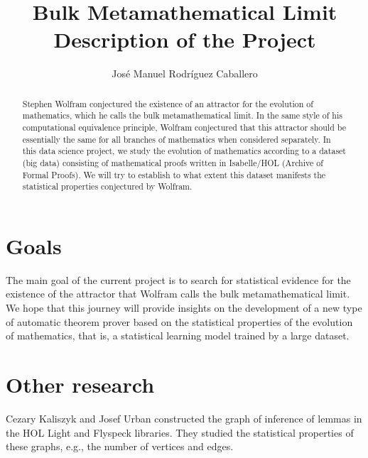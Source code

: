 \documentclass{article}
\title{Bulk Metamathematical Limit \\
\small{Description of the Project}}
\author{Jos\'e Manuel Rodr\'iguez Caballero}
\begin{document}
\maketitle

\begin{abstract}
	Stephen Wolfram conjectured the existence of an attractor for the evolution of mathematics, which he calls the bulk metamathematical limit. In the same style of his computational equivalence principle, Wolfram conjectured that this attractor should be essentially the same for all branches of mathematics when considered separately. In this data science project, we study the evolution of mathematics according to a dataset (big data) consisting of mathematical proofs written in Isabelle/HOL (Archive of Formal Proofs). We will try to establish to what extent this dataset manifests the statistical properties conjectured by Wolfram.
\end{abstract}



\section*{Goals}

The main goal of the current project is to search for statistical evidence for the existence of the attractor that Wolfram calls the bulk metamathematical limit. We hope that this journey will provide insights on the development of a new type of automatic theorem prover based on the statistical properties of the evolution of mathematics, that is, a statistical learning model trained by a large dataset.


\section*{Other research}


Cezary Kaliszyk and Josef Urban \cite{kaliszyk2015learning} constructed the graph of inference of lemmas in the HOL Light and Flyspeck libraries. They studied the statistical properties of these graphs, e.g., the number of vertices and edges.



\nocite{*}

\printbibliography
\end{document}
